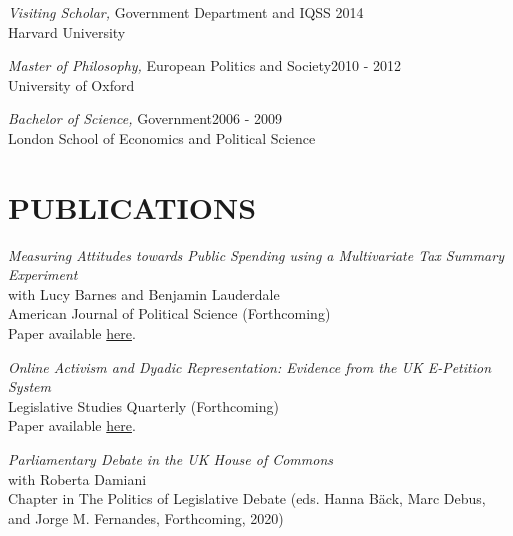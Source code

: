 \documentclass[centered]{res}
\begin{document}
\begin{resume}
		{\sl Visiting Scholar,} Government Department and IQSS \hfill  2014\\
                 Harvard University  

		{\sl Master of Philosophy,} European Politics and Society\hfill 2010 - 2012 \\
                University of Oxford

		{\sl Bachelor of Science,} Government\hfill 2006 - 2009 \\
                London School of Economics and Political Science

\section{PUBLICATIONS} 

{\sl Measuring Attitudes towards Public Spending using a Multivariate Tax Summary Experiment} \\
with Lucy Barnes and Benjamin Lauderdale\\
American Journal of Political Science (Forthcoming)\\
Paper available \href{https://www.jackblumenau.com/papers/spending_experiment.pdf} {here}.


{\sl Online Activism and Dyadic Representation: Evidence from the UK E-Petition System} \\
Legislative Studies Quarterly (Forthcoming) \\
Paper available \href{https://www.jackblumenau.com/papers/petitions.pdf} {here}.

{\sl Parliamentary Debate in the UK House of Commons} \\
with Roberta Damiani \\
Chapter in The Politics of Legislative Debate (eds. Hanna B{\"a}ck, Marc Debus, and Jorge M. Fernandes, Forthcoming, 2020) 


\end{resume}
\end{document}
